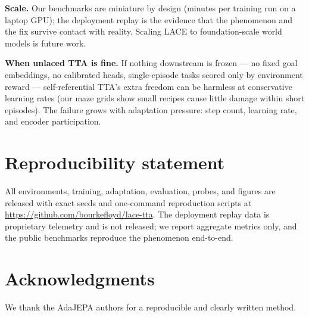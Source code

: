 \documentclass{article}
\begin{document}
\textbf{Scale.} Our benchmarks are miniature by design (minutes per training
run on a laptop GPU); the deployment replay is the evidence that the
phenomenon and the fix survive contact with reality. Scaling LACE to
foundation-scale world models is future work.

\textbf{When unlaced TTA is fine.} If nothing downstream is frozen --- no
fixed goal embeddings, no calibrated heads, single-episode tasks scored only
by environment reward --- self-referential TTA's extra freedom can be harmless
at conservative learning rates (our maze grids show small recipes cause little
damage within short episodes). The failure grows with adaptation pressure:
step count, learning rate, and encoder participation.

\section*{Reproducibility statement}
All environments, training, adaptation, evaluation, probes, and figures are
released with exact seeds and one-command reproduction scripts at
\url{https://github.com/bourkefloyd/lace-tta}. The
deployment replay data is proprietary telemetry and is not released; we
report aggregate metrics only, and the public benchmarks reproduce the
phenomenon end-to-end.

\section*{Acknowledgments}
We thank the AdaJEPA authors for a reproducible and clearly written method.



\end{document}
